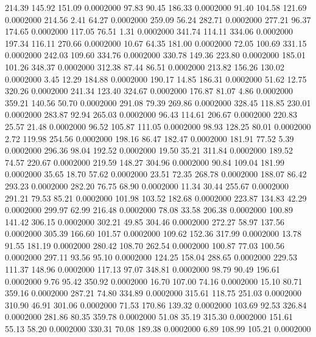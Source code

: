  214.39  145.92  151.09   0.0002000
  97.83   90.45  186.33   0.0002000
  91.40  104.58  121.69   0.0002000
 214.56    2.41   64.27   0.0002000
 259.09   56.24  282.71   0.0002000
 277.21   96.37  174.65   0.0002000
 117.05   76.51    1.31   0.0002000
 341.74  114.11  334.06   0.0002000
 197.34  116.11  270.66   0.0002000
  10.67   64.35  181.00   0.0002000
  72.05  100.69  331.15   0.0002000
 242.03  109.60  334.76   0.0002000
 330.78  149.36  223.80   0.0002000
 185.01  101.26  348.37   0.0002000
 312.38   87.44   86.51   0.0002000
 213.82  156.26  130.02   0.0002000
   3.45   12.29  184.88   0.0002000
 190.17   14.85  186.31   0.0002000
  51.62   12.75  320.26   0.0002000
 241.34  123.40  324.67   0.0002000
 176.87   81.07    4.86   0.0002000
 359.21  140.56   50.70   0.0002000
 291.08   79.39  269.86   0.0002000
 328.45  118.85  230.01   0.0002000
 283.87   92.94  265.03   0.0002000
  96.43  114.61  206.67   0.0002000
 220.83   25.57   21.48   0.0002000
  96.52  105.87  111.05   0.0002000
  98.93  128.25   80.01   0.0002000
   2.72  119.98  254.56   0.0002000
 198.16   86.47  182.47   0.0002000
 181.91   77.52    5.39   0.0002000
 296.36   98.04  192.52   0.0002000
  19.50   35.21  311.84   0.0002000
 189.52   74.57  220.67   0.0002000
 219.59  148.27  304.96   0.0002000
  90.84  109.04  181.99   0.0002000
  35.65   18.70   57.62   0.0002000
  23.51   72.35  268.78   0.0002000
 188.07   86.42  293.23   0.0002000
 282.20   76.75   68.90   0.0002000
  11.34   30.44  255.67   0.0002000
 291.21   79.53   85.21   0.0002000
 101.98  103.52  182.68   0.0002000
 223.87  134.83   42.29   0.0002000
 299.97   62.99  216.48   0.0002000
  78.08   33.58  206.38   0.0002000
 100.89  141.42  306.15   0.0002000
 302.21   49.85  304.46   0.0002000
 272.27   58.97  137.56   0.0002000
 305.39  166.60  101.57   0.0002000
 109.62  152.36  317.99   0.0002000
  13.78   91.55  181.19   0.0002000
 280.42  108.70  262.54   0.0002000
 100.87   77.03  100.56   0.0002000
 297.11   93.56   95.10   0.0002000
 124.25  158.04  288.65   0.0002000
 229.53  111.37  148.96   0.0002000
 117.13   97.07  348.81   0.0002000
  98.79   90.49  196.61   0.0002000
   9.76   95.42  350.92   0.0002000
  16.70  107.00   74.16   0.0002000
  15.10   80.71  359.16   0.0002000
 287.21   74.80  334.89   0.0002000
 315.61  118.75  251.03   0.0002000
 310.90   46.91  301.06   0.0002000
  71.53  170.86  139.32   0.0002000
 103.69   92.53  326.84   0.0002000
 281.86   80.35  359.78   0.0002000
  51.08   35.19  315.30   0.0002000
 151.61   55.13   58.20   0.0002000
 330.31   70.08  189.38   0.0002000
   6.89  108.99  105.21   0.0002000
